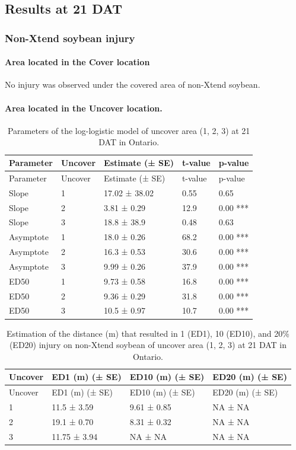 \documentclass[]{article}
\let\oldparagraph\paragraph
\renewcommand{\paragraph}[1]{\oldparagraph{#1}\mbox{}}
\begin{document}
\newpage

\pagebreak

\subsection{Results at 21 DAT}\label{results-at-21-dat-3}

\subsubsection{Non-Xtend soybean
injury}\label{non-xtend-soybean-injury-5}

\paragraph{\texorpdfstring{Area located in the \textbf{Cover}
location}{Area located in the Cover location}}\label{area-located-in-the-cover-location}

No injury was observed under the covered area of non-Xtend soybean.

\newpage

\pagebreak

\paragraph{\texorpdfstring{Area located in the \textbf{Uncover}
location.}{Area located in the Uncover location.}}\label{area-located-in-the-uncover-location.}

\begin{longtable}[]{@{}lllll@{}}
\caption{Parameters of the log-logistic model of uncover area (1, 2, 3)
at 21 DAT in Ontario.}\tabularnewline
\toprule
Parameter & Uncover & Estimate (± SE) & t-value & p-value\tabularnewline
\midrule
\endfirsthead
\toprule
Parameter & Uncover & Estimate (± SE) & t-value & p-value\tabularnewline
\midrule
\endhead
Slope & 1 & 17.02 ± 38.02 & 0.55 & 0.65\tabularnewline
Slope & 2 & 3.81 ± 0.29 & 12.9 & 0.00 ***\tabularnewline
Slope & 3 & 18.8 ± 38.9 & 0.48 & 0.63\tabularnewline
Asymptote & 1 & 18.0 ± 0.26 & 68.2 & 0.00 ***\tabularnewline
Asymptote & 2 & 16.3 ± 0.53 & 30.6 & 0.00 ***\tabularnewline
Asymptote & 3 & 9.99 ± 0.26 & 37.9 & 0.00 ***\tabularnewline
ED50 & 1 & 9.73 ± 0.58 & 16.8 & 0.00 ***\tabularnewline
ED50 & 2 & 9.36 ± 0.29 & 31.8 & 0.00 ***\tabularnewline
ED50 & 3 & 10.5 ± 0.97 & 10.7 & 0.00 ***\tabularnewline
\bottomrule
\end{longtable}

\begin{longtable}[]{@{}llll@{}}
\caption{Estimation of the distance (m) that resulted in 1 (ED1), 10
(ED10), and 20\% (ED20) injury on non-Xtend soybean of uncover area (1,
2, 3) at 21 DAT in Ontario.}\tabularnewline
\toprule
Uncover & ED1 (m) (± SE) & ED10 (m) (± SE) & ED20 (m) (±
SE)\tabularnewline
\midrule
\endfirsthead
\toprule
Uncover & ED1 (m) (± SE) & ED10 (m) (± SE) & ED20 (m) (±
SE)\tabularnewline
\midrule
\endhead
1 & 11.5 ± 3.59 & 9.61 ± 0.85 & NA ± NA\tabularnewline
2 & 19.1 ± 0.70 & 8.31 ± 0.32 & NA ± NA\tabularnewline
3 & 11.75 ± 3.94 & NA ± NA & NA ± NA\tabularnewline
\bottomrule
\end{longtable}
\end{document}
